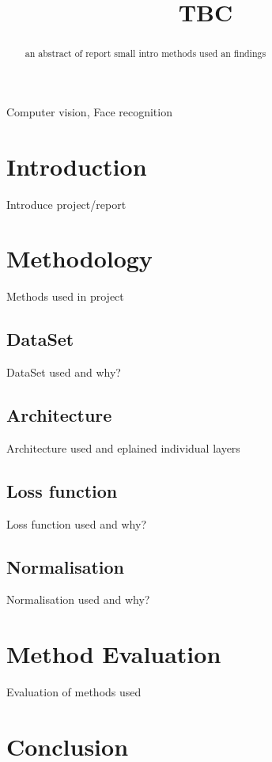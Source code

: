 \documentclass{article}
\title{TBC}
\begin{document}
%
\maketitle
%
\begin{abstract}
an abstract of report small intro methods used an findings
\end{abstract}
%
\begin{keywords}
Computer vision, Face recognition
\end{keywords}
%
\section{Introduction}
\label{sec:intro}
Introduce project/report


\section{Methodology}
\label{sec:method}
Methods used in project\cite{taigman_deepface_2014}

 \subsection{DataSet}
\label{ssec:data}
DataSet used and why?\cite{wang_deep_2021}


 \subsection{Architecture}
\label{ssec:arch}
Architecture used and eplained individual layers



 \subsection{Loss function}
\label{ssec:loss}
Loss function used and why?

\subsection{Normalisation}
\label{ssec:norm}
Normalisation used and why?


\section{Method Evaluation}
\label{sec:methodeval}

Evaluation of methods used

\section{Conclusion}
\label{sec:con}
\end{document}
